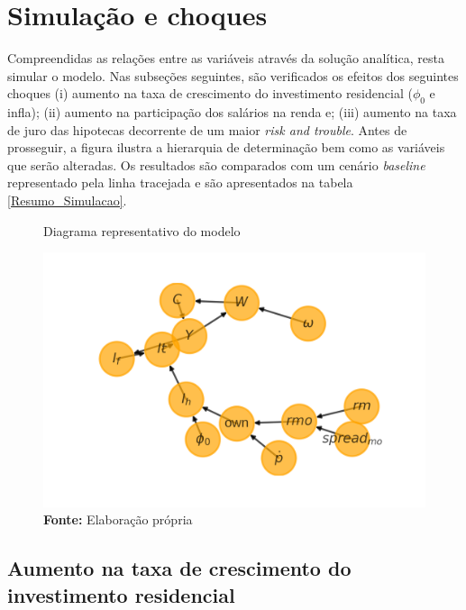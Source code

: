 \section{Simulação e choques}
\label{SecChoques}

Compreendidas as relações entre as variáveis através da solução analítica, resta simular o modelo. Nas subseções seguintes, são verificados os efeitos dos seguintes choques
(i) aumento na taxa de crescimento do investimento residencial ($\phi_0$ e infla); (ii) aumento na participação dos salários na renda e;  (iii) aumento na taxa de juro das hipotecas decorrente de um maior \textit{risk and trouble}. Antes de prosseguir, a figura \label{DAG} ilustra a hierarquia de determinação bem como as variáveis que serão alteradas. Os resultados são comparados com um cenário \textit{baseline} representado pela linha tracejada e são apresentados na tabela \ref{Resumo_Simulacao}.

\begin{figure}[htb]
	\centering
	\label{DAG}
	\caption{Diagrama representativo do modelo}
	\includegraphics{../../Modelo/Versoes/Dag.png}
	\caption*{\textbf{Fonte:} Elaboração própria}
\end{figure}



\subsection*{Aumento na taxa de crescimento do investimento residencial}


